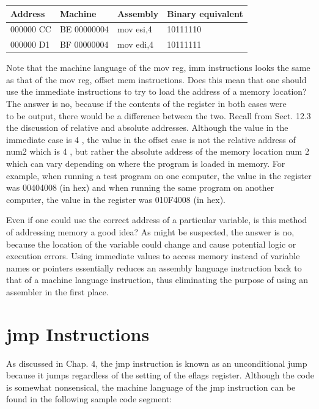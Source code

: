 \documentclass[10pt]{book}
\begin{document}
\begin{center}
\begin{tabular}{|l|l|l|l|}
\hline
Address & Machine & Assembly & Binary equivalent \\
\hline
000000 CC & BE 00000004 & mov esi,4 & 10111110 \\
\hline
000000 D1 & BF 00000004 & mov edi,4 & 10111111 \\
\hline
\end{tabular}
\end{center}

Note that the machine language of the mov reg, imm instructions looks the same as that of the mov reg, offset mem instructions. Does this mean that one should use the immediate instructions to try to load the address of a memory location? The answer is no, because if the contents of the register in both cases were\\
to be output, there would be a difference between the two. Recall from Sect. 12.3 the discussion of relative and absolute addresses. Although the value in the immediate case is 4 , the value in the offset case is not the relative address of num2 which is 4 , but rather the absolute address of the memory location num 2 which can vary depending on where the program is loaded in memory. For example, when running a test program on one computer, the value in the register was 00404008 (in hex) and when running the same program on another computer, the value in the register was 010F4008 (in hex).


Even if one could use the correct address of a particular variable, is this method of addressing memory a good idea? As might be suspected, the answer is no, because the location of the variable could change and cause potential logic or execution errors. Using immediate values to access memory instead of variable names or pointers essentially reduces an assembly language instruction back to that of a machine language instruction, thus eliminating the purpose of using an assembler in the first place.

\section{jmp Instructions}
As discussed in Chap. 4, the jmp instruction is known as an unconditional jump because it jumps regardless of the setting of the eflags register. Although the code is somewhat nonsensical, the machine language of the jmp instruction can be found in the following sample code segment:
\end{document}
